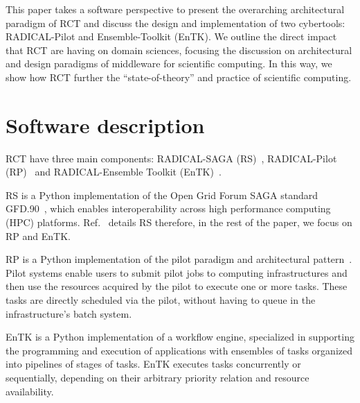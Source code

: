 \documentclass[preprint,12pt, a4paper]{elsarticle}
\begin{document}
This paper takes a software perspective to present the overarching
architectural paradigm of RCT and discuss the design and implementation of
two cybertools: RADICAL-Pilot and Ensemble-Toolkit (EnTK). We outline the
direct impact that RCT are having on domain sciences, focusing the discussion
on architectural and design paradigms of middleware for scientific computing.
In this way, we show how RCT further the ``state-of-theory'' and practice of
scientific computing.


\section{Software description}\label{sec:description}



RCT have three main components: RADICAL-SAGA (RS)~\cite{merzky2015saga},
RADICAL-Pilot (RP)~\cite{merzky2018using} and RADICAL-Ensemble Toolkit
(EnTK)~\cite{balasubramanian2016ensemble,balasubramanian2018harnessing}.

RS is a Python implementation of the Open Grid Forum SAGA standard
GFD.90~\cite{goodale2006saga},
which enables interoperability across high performance computing (HPC)
platforms.
Ref.~\cite{merzky2015saga} details RS therefore, in the rest of the paper, we
focus on RP and EnTK.

RP is a Python implementation of the pilot paradigm and architectural
pattern~\cite{turilli2018comprehensive}. Pilot systems enable users to submit
pilot jobs to computing infrastructures and then use the resources acquired
by the pilot to execute one or more tasks. These tasks are directly scheduled
via the pilot, without having to queue in the infrastructure's batch system.

EnTK is a Python implementation of a workflow engine, specialized in supporting
the programming and execution of applications with ensembles of tasks organized
into pipelines of stages of tasks. EnTK executes tasks concurrently or
sequentially, depending on their arbitrary priority relation and resource
availability.
\end{document}
